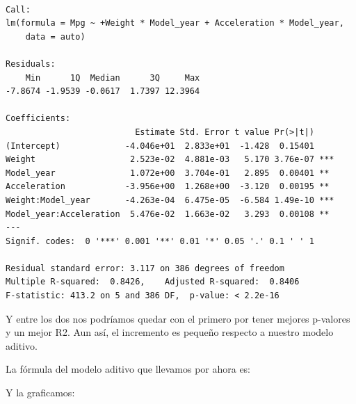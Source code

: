 \documentclass[
]{article}
\newenvironment{Shaded}{\begin{snugshade}}{\end{snugshade}}
\newcommand{\CommentTok}[1]{\textcolor[rgb]{0.56,0.35,0.01}{\textit{#1}}}
\newcommand{\DataTypeTok}[1]{\textcolor[rgb]{0.13,0.29,0.53}{#1}}
\newcommand{\KeywordTok}[1]{\textcolor[rgb]{0.13,0.29,0.53}{\textbf{#1}}}
\newcommand{\NormalTok}[1]{#1}
\newcommand{\OperatorTok}[1]{\textcolor[rgb]{0.81,0.36,0.00}{\textbf{#1}}}
\newcommand{\StringTok}[1]{\textcolor[rgb]{0.31,0.60,0.02}{#1}}
\begin{document}
\begin{verbatim}

Call:
lm(formula = Mpg ~ +Weight * Model_year + Acceleration * Model_year, 
    data = auto)

Residuals:
    Min      1Q  Median      3Q     Max 
-7.8674 -1.9539 -0.0617  1.7397 12.3964 

Coefficients:
                          Estimate Std. Error t value Pr(>|t|)    
(Intercept)             -4.046e+01  2.833e+01  -1.428  0.15401    
Weight                   2.523e-02  4.881e-03   5.170 3.76e-07 ***
Model_year               1.072e+00  3.704e-01   2.895  0.00401 ** 
Acceleration            -3.956e+00  1.268e+00  -3.120  0.00195 ** 
Weight:Model_year       -4.263e-04  6.475e-05  -6.584 1.49e-10 ***
Model_year:Acceleration  5.476e-02  1.663e-02   3.293  0.00108 ** 
---
Signif. codes:  0 '***' 0.001 '**' 0.01 '*' 0.05 '.' 0.1 ' ' 1

Residual standard error: 3.117 on 386 degrees of freedom
Multiple R-squared:  0.8426,    Adjusted R-squared:  0.8406 
F-statistic: 413.2 on 5 and 386 DF,  p-value: < 2.2e-16
\end{verbatim}

Y entre los dos nos podríamos quedar con el primero por tener mejores
p-valores y un mejor R2. Aun así, el incremento es pequeño respecto a
nuestro modelo aditivo.

La fórmula del modelo aditivo que llevamos por ahora es:

Y la graficamos:

\begin{Shaded}
\end{Shaded}
\end{document}

